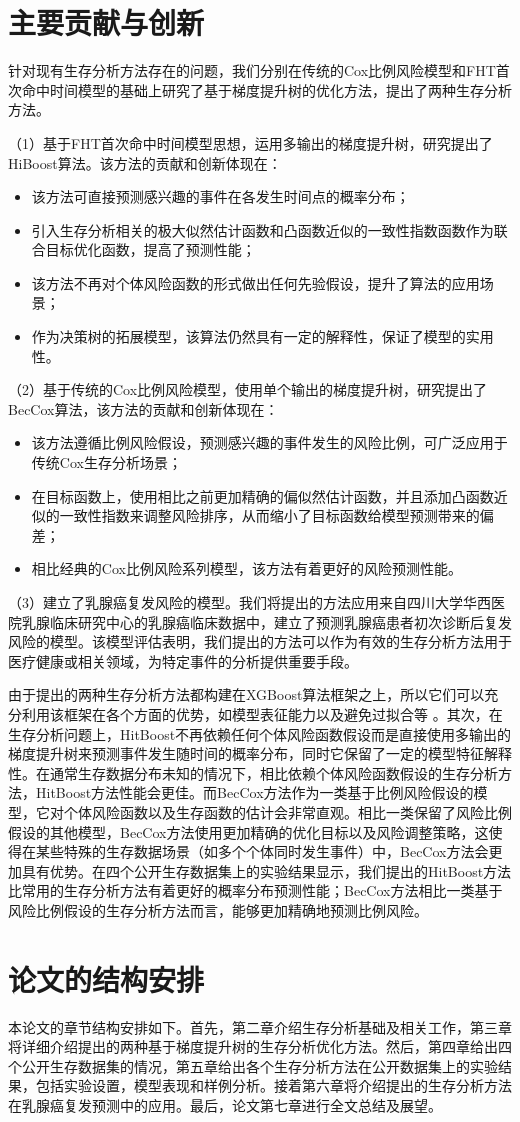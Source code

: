 \section{主要贡献与创新}

针对现有生存分析方法存在的问题，我们分别在传统的Cox比例风险模型和FHT首次命中时间模型的基础上研究了基于梯度提升树的优化方法，提出了两种生存分析方法。

（1）基于FHT首次命中时间模型思想，运用多输出的梯度提升树，研究提出了HiBoost算法。该方法的贡献和创新体现在：
\begin{itemize}
    \item 该方法可直接预测感兴趣的事件在各发生时间点的概率分布；
    \item 引入生存分析相关的极大似然估计函数和凸函数近似的一致性指数函数作为联合目标优化函数，提高了预测性能；
    \item 该方法不再对个体风险函数的形式做出任何先验假设，提升了算法的应用场景；
    \item 作为决策树的拓展模型，该算法仍然具有一定的解释性，保证了模型的实用性。
\end{itemize}


（2）基于传统的Cox比例风险模型，使用单个输出的梯度提升树，研究提出了BecCox算法，该方法的贡献和创新体现在：
\begin{itemize}
    \item 该方法遵循比例风险假设，预测感兴趣的事件发生的风险比例，可广泛应用于传统Cox生存分析场景；
    \item 在目标函数上，使用相比之前更加精确的偏似然估计函数，并且添加凸函数近似的一致性指数来调整风险排序，从而缩小了目标函数给模型预测带来的偏差；
    \item 相比经典的Cox比例风险系列模型，该方法有着更好的风险预测性能。
\end{itemize}

（3）建立了乳腺癌复发风险的模型。我们将提出的方法应用来自四川大学华西医院乳腺临床研究中心的乳腺癌临床数据中，建立了预测乳腺癌患者初次诊断后复发风险的模型。该模型评估表明，我们提出的方法可以作为有效的生存分析方法用于医疗健康或相关领域，为特定事件的分析提供重要手段。

由于提出的两种生存分析方法都构建在XGBoost算法框架之上，所以它们可以充分利用该框架在各个方面的优势，如模型表征能力以及避免过拟合等 。其次，在生存分析问题上，HitBoost不再依赖任何个体风险函数假设而是直接使用多输出的梯度提升树来预测事件发生随时间的概率分布，同时它保留了一定的模型特征解释性。在通常生存数据分布未知的情况下，相比依赖个体风险函数假设的生存分析方法，HitBoost方法性能会更佳。而BecCox方法作为一类基于比例风险假设的模型，它对个体风险函数以及生存函数的估计会非常直观。相比一类保留了风险比例假设的其他模型，BecCox方法使用更加精确的优化目标以及风险调整策略，这使得在某些特殊的生存数据场景（如多个个体同时发生事件）中，BecCox方法会更加具有优势。在四个公开生存数据集上的实验结果显示，我们提出的HitBoost方法比常用的生存分析方法有着更好的概率分布预测性能；BecCox方法相比一类基于风险比例假设的生存分析方法而言，能够更加精确地预测比例风险。

\section{论文的结构安排}

本论文的章节结构安排如下。首先，第二章介绍生存分析基础及相关工作，第三章将详细介绍提出的两种基于梯度提升树的生存分析优化方法。然后，第四章给出四个公开生存数据集的情况，第五章给出各个生存分析方法在公开数据集上的实验结果，包括实验设置，模型表现和样例分析。接着第六章将介绍提出的生存分析方法在乳腺癌复发预测中的应用。最后，论文第七章进行全文总结及展望。